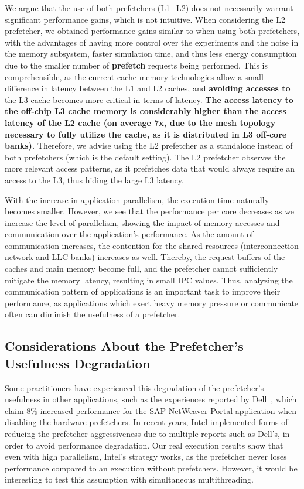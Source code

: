 \documentclass[AMA,final,STIX1COL]{WileyNJD-v2}
\newcommand\new[1]{{\color{red}\textbf{#1}}}
\begin{document}
We argue that the use of both prefetchers (L1+L2) does not necessarily warrant significant performance gains, which is not intuitive.
When considering the L2 prefetcher, we obtained performance gains similar to when using both prefetchers, with the advantages of having more control over the experiments and the noise in the memory subsystem, faster simulation time, and thus less energy consumption due to the smaller number of \new{prefetch} requests being performed. 
This is comprehensible, as the current cache memory technologies allow a small difference in latency between the L1 and L2 caches, and \new{avoiding accesses to} the L3 cache becomes more critical in terms of latency.
\new{The access latency to the off-chip L3 cache memory is considerably higher than the access latency of the L2 cache (on average 7x, due to the mesh topology necessary to fully utilize the cache, as it is distributed in L3 off-core banks).}
Therefore, we advise using the L2 prefetcher as a standalone instead of both prefetchers (which is the default setting).
The L2 prefetcher observes the more relevant access patterns, as it prefetches data that would always require an access to the L3, thus hiding the large L3 latency.


With the increase in application parallelism, the execution time naturally becomes smaller. 
However, we see that the performance per core decreases as we increase the level of parallelism, showing the impact of memory accesses and communication over the application's performance.
As the amount of communication increases, the contention for the shared resources (interconnection network and LLC banks) increases as well.
Thereby, the request buffers of the caches and main memory become full, and the prefetcher cannot sufficiently mitigate the memory latency, resulting in small IPC values.
Thus, analyzing the communication pattern of applications is an important task to improve their performance, as applications which exert heavy memory pressure or communicate often can diminish the usefulness of a prefetcher.

\subsection{Considerations About the Prefetcher's Usefulness Degradation}
\label{subsec:pref_usefulness_thoughts}
Some practitioners have experienced this degradation of the prefetcher's usefulness in other applications, such as the experiences reported by Dell~\cite{SAPguide}, which claim 8\% increased performance for the SAP NetWeaver Portal application when disabling the hardware prefetchers.
In recent years, Intel implemented forms of reducing the prefetcher aggressiveness due to multiple reports such as Dell's, in order to avoid performance degradation.
Our real execution results show that even with high parallelism, Intel's strategy works, as the prefetcher never loses performance compared to an execution without prefetchers.
However, it would be interesting to test this assumption with simultaneous multithreading.
\end{document}

